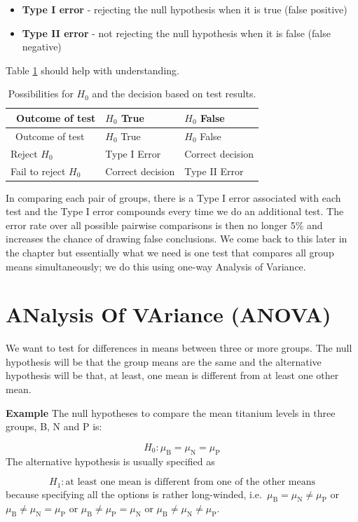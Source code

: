 \documentclass[
  oneside]{krantz}
\begin{document}
\begin{itemize}
\item
  \textbf{Type I error} - rejecting the null hypothesis when it is true (false positive)
\item
  \textbf{Type II error} - not rejecting the null hypothesis when it is false (false negative)
\end{itemize}

Table \ref{tab:type12} should help with understanding.

\begin{longtable}[]{@{}lll@{}}
\caption{\label{tab:type12} Possibilities for \(H_0\) and the decision based on test results.}\tabularnewline
\toprule
~Outcome of test & \(H_0\) True & \(H_0\) False\tabularnewline
\midrule
\endfirsthead
\toprule
~Outcome of test & \(H_0\) True & \(H_0\) False\tabularnewline
\midrule
\endhead
Reject \(H_0\) & Type I Error & Correct decision\tabularnewline
Fail to reject \(H_0\) & Correct decision & Type II Error\tabularnewline
\bottomrule
\end{longtable}

In comparing each pair of groups, there is a Type I error associated with each test and the Type I error compounds every time we do an additional test. The error rate over all possible pairwise comparisons is then no longer 5\% and increases the chance of drawing false conclusions. We come back to this later in the chapter but essentially what we need is one test that compares all group means simultaneously; we do this using one-way Analysis of Variance.

\hypertarget{analysis-of-variance-anova}{%
\section{ANalysis Of VAriance (ANOVA)}\label{analysis-of-variance-anova}}

We want to test for differences in means between three or more groups. The null hypothesis will be that the group means are the same and the alternative hypothesis will be that, at least, one mean is different from at least one other mean.

\textbf{Example} The null hypotheses to compare the mean titanium levels in three groups, B, N and P is:

\[ H_0: \mu_{\textrm{B}} = \mu_{\textrm{N}} = \mu_{\textrm{P}} \]
The alternative hypothesis is usually specified as

\[H_1: \textrm{at least one mean is different from one of the other means}\]
because specifying all the options is rather long-winded, i.e.~\(\mu_{\textrm{B}} = \mu_{\textrm{N}} \ne \mu_{\textrm{P}}\) or
\(\mu_{\textrm{B}} \ne \mu_{\textrm{N}} = \mu_{\textrm{P}}\) or
\(\mu_{\textrm{B}} \ne \mu_{\textrm{P}} = \mu_{\textrm{N}}\) or
\(\mu_{\textrm{B}} \ne \mu_{\textrm{N}} \ne \mu_{\textrm{P}}\).
\end{document}
